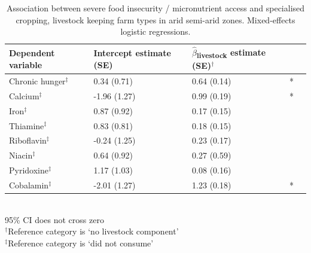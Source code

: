 \begin{table}[H]
  \captionsetup{singlelinecheck = false, justification=justified}
  \caption{
  Association between severe food insecurity / micronutrient access and specialised cropping, livestock keeping farm types in arid semi-arid zones. Mixed-effects logistic regressions.
  }
  \label{tab:C_13_3}
  \small
\begin{tabular}{L{5cm} C{2.5cm} C{2.5cm} C{2cm} C{2cm}}
\toprule
Dependent variable & Intercept estimate (SE) & $\hat{\beta}$\textsubscript{livestock} estimate (SE)$^{\dag}$ &  \\
\midrule
Chronic hunger$^{\ddag}$ & 0.34 (0.71) & 0.64 (0.14) & * \\
Calcium$^{\ddag}$ & -1.96 (1.27) & 0.99 (0.19) & *\\
Iron$^{\ddag}$ & 0.87 (0.92) & 0.17 (0.15) &  \\
Thiamine$^{\ddag}$ & 0.83 (0.81) & 0.18 (0.15) &  \\
Riboflavin$^{\ddag}$ & -0.24 (1.25) & 0.23 (0.17) &  \\
Niacin$^{\ddag}$ & 0.64 (0.92) & 0.27 (0.59) &  \\
Pyridoxine$^{\ddag}$ & 1.17 (1.03) & 0.08 (0.16) &  \\
Cobalamin$^{\ddag}$ & -2.01 (1.27) & 1.23 (0.18) & * \\
\bottomrule
\end{tabular}
\footnotesize
\raggedright
\\
95\% CI does not cross zero \\
$^{\dag}$Reference category is `no livestock component' \\
$^{\ddag}$Reference category is `did not consume'
\end{table}



